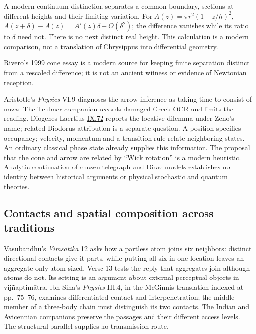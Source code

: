 \documentclass[11pt,a4paper]{article}
\begin{document}
A modern continuum distinction separates a common boundary, sections at
different heights and their limiting variation. For
\(A(z)=\pi r^2(1-z/h)^2\), \(A(z+\delta)-A(z)=A'(z)\delta+O(\delta^2)\);
the difference vanishes while its ratio to \(\delta\) need not. There is
no next distinct real height. This calculation is a modern comparison,
not a translation of Chrysippus into differential geometry.

Rivero's \href{../docs/Rivero_Cone_1999.md}{1999 cone essay} is a modern
source for keeping finite separation distinct from a rescaled
difference; it is not an ancient witness or evidence of Newtonian
reception.

Aristotle's \emph{Physics} VI.9 diagnoses the arrow inference as taking
time to consist of nows. The
\href{../docs/classics/Aristotle_Physics_VI9_Zeno_Teubner1879_OCR.md}{Teubner
companion} records damaged Greek OCR and limits the reading. Diogenes
Laertius
\href{../docs/classics/DiogenesLaertius_BookIX_Hicks1925_wikisource.md}{IX.72}
reports the locative dilemma under Zeno's name; related Diodorus
attribution is a separate question. A position specifies occupancy;
velocity, momentum and a transition rule relate neighboring states. An
ordinary classical phase state already supplies this information. The
proposal that the cone and arrow are related by ``Wick rotation'' is a
modern heuristic. Analytic continuation of chosen telegraph and Dirac
models establishes no identity between historical arguments or physical
stochastic and quantum theories.

\hypertarget{contacts-and-spatial-composition-across-traditions}{%
\subsection{Contacts and spatial composition across
traditions}\label{contacts-and-spatial-composition-across-traditions}}

Vasubandhu's \emph{Vimsatika} 12 asks how a partless atom joins six
neighbors: distinct directional contacts give it parts, while putting
all six in one location leaves an aggregate only atom-sized. Verse 13
tests the reply that aggregates join although atoms do not. Its setting
is an argument about external perceptual objects in vijñaptimātra. Ibn
Sina's \emph{Physics} III.4, in the McGinnis translation indexed at
pp.~75--76, examines differentiated contact and interpenetration; the
middle member of a three-body chain must distinguish its two contacts.
The
\href{../docs/batches/H10/indian-contact-motion-companion.md}{Indian}
and
\href{../docs/batches/H10/avicennian-contact-source-companion.md}{Avicennian}
companions preserve the passages and their different access levels. The
structural parallel supplies no transmission route.
\end{document}
